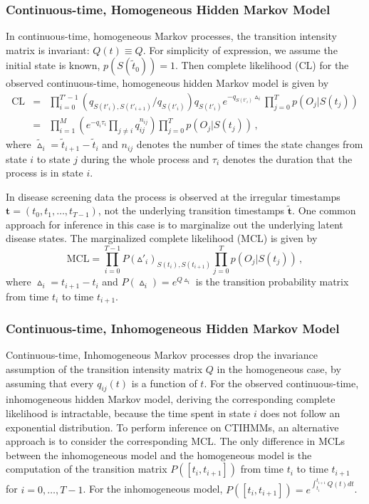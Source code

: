\documentclass{article}
\begin{document}
\subsubsection{Continuous-time, Homogeneous Hidden Markov Model}
In continuous-time, homogeneous Markov processes, the transition intensity matrix is invariant: $Q(t) \equiv Q$. For simplicity of expression, we assume the initial state is known, $p(S(\tilde{t}_0)) = 1$. Then complete likelihood (CL) for the observed continuous-time, homogeneous hidden Markov model is given by 
\begin{eqnarray}
\mathrm{CL} & = & \prod_{i = 0}^{T'-1}(q_{S(t'_i),S(t'_{i+1})}/q_{S(t'_i)})q_{S(t'_i)}e^{-q_{S(t'_i)}\vartriangle_i} \prod_{j = 0}^Tp(O_j|S(t_j)) \nonumber\\
& = & \prod_{i = 1}^{M}\left(e^{-q_i\tau_i} \prod_{j\neq i} q_{ij}^{n_{ij}}\right)\prod_{j=0}^Tp(O_j|S(t_j))\,,
\label{CL}
\end{eqnarray}
where $\tilde{\vartriangle}_i = \tilde{t}_{i+1} - \tilde{t}_i$ and $n_{ij}$ denotes the number of times the state changes from state $i$ to state $j$ during the whole process and $\tau_i$ denotes the duration that the process is in state $i$.

In disease screening data the process is observed at the irregular timestamps $\bm t = (t_0, t_1, \ldots, t_{T-1})$, not  the underlying transition timestamps $\tilde{\bm t}$. One common approach for inference in this case is to marginalize out the underlying latent disease states. The marginalized complete likelihood (MCL) is given by
\begin{equation*}
\mathrm{MCL} = \prod_{i = 0}^{T-1}P(\vartriangle'_i)_{S(t_i), S(t_{i+1})}\prod_{j = 0}^T p(O_j|S(t_j)) \,,
\end{equation*}
where $\vartriangle_i = t_{i+1} - t_i$ and $P(\vartriangle_i) = e^{Q \vartriangle_i }$ is the transition probability matrix from time $t_i$ to time $t_{i+1}$.  

\subsubsection{Continuous-time, Inhomogeneous Hidden Markov Model} 

Continuous-time, Inhomogeneous Markov processes drop the invariance assumption of the transition intensity matrix $Q$ in the homogeneous case, by assuming that every $q_{ij}(t)$ is a function of $t$. For the observed continuous-time, inhomogeneous hidden Markov model, deriving the corresponding complete likelihood is intractable, because the time spent in state $i$ does not follow an exponential distribution. To perform inference on CTIHMMs, an alternative approach is to consider the corresponding MCL. The only difference in MCLs between the inhomogeneous model and the homogeneous model is the computation of the transition matrix $P([t_i, t_{i+1}])$ from time $t_i$ to time $t_{i+1}$ for $i = 0, \ldots, T - 1$. For the inhomogeneous model, $P([t_i, t_{i+1}]) = e^{\int _{t_i}^{t_{i+1}}Q(t)dt}$.
\end{document}
